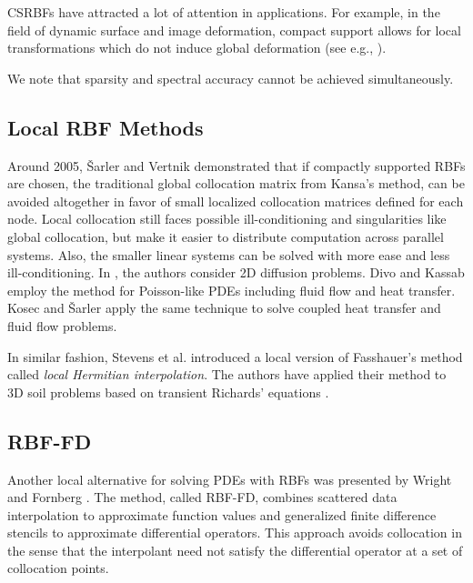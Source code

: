 \documentclass{report}
\begin{document}
{CSRBFs have attracted a lot of attention in applications. For example, in the field of dynamic surface and image deformation, compact support allows for local transformations which do not induce global deformation (see e.g., \cite{Yang2008, Lin2009, Correa2007}). 

We note that sparsity and spectral accuracy cannot be achieved simultaneously. 


\subsection{Local RBF Methods}
Around 2005, \v{S}arler and Vertnik \cite{Sarler2006, Vertnik2006} demonstrated that if compactly supported RBFs are chosen, the traditional global 
collocation matrix from Kansa's method, can be avoided altogether in favor of small localized collocation matrices defined for 
each node. Local collocation still faces possible ill-conditioning and singularities 
like global collocation, but make it easier to distribute computation across parallel systems. Also, the smaller linear systems can be 
solved 
with more ease and less ill-conditioning. In \cite{Sarler2006}, the authors consider 2D diffusion problems. Divo and Kassab \cite{Divo2007} %
employ the 
method for Poisson-like PDEs including fluid flow and heat transfer. Kosec and \v{S}arler \cite{Kosec2008} apply the 
same technique to solve coupled heat transfer and fluid flow problems.

In similar fashion, Stevens et al. \cite{Stevens2009a} introduced a local version of 
Fasshauer's method called \emph{local Hermitian interpolation}. The authors have applied their method to 3D soil 
problems based on transient Richards' equations \cite{Stevens2008a, Stevens2009a, Stevens2009b}.




\subsection{RBF-FD}

Another local alternative for solving PDEs with RBFs was presented by Wright and Fornberg \cite{Wright2004, WrightFornberg06}. The method, called RBF-FD, combines scattered data interpolation to approximate function values and generalized finite difference stencils to approximate differential operators. This approach avoids collocation in the sense that the interpolant need not satisfy the differential operator at a set of collocation points. 

}
\end{document}
